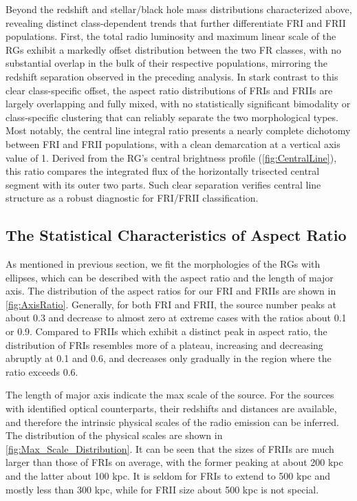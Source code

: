 \documentclass{aa}
\begin{document}
Beyond the redshift and stellar/black hole mass distributions characterized above, revealing distinct class-dependent trends that further differentiate FRI and FRII populations. 
First, the total radio luminosity and maximum linear scale of the RGs exhibit a markedly offset distribution between the two FR classes, with no substantial overlap in the bulk of their respective populations, mirroring the redshift separation observed in the preceding analysis.
In stark contrast to this clear class-specific offset, the aspect ratio distributions of FRIs and FRIIs are largely overlapping and fully mixed, with no statistically significant bimodality or class-specific clustering that can reliably separate the two morphological types.
Most notably, the central line integral ratio presents a nearly complete dichotomy between FRI and FRII populations, with a clean demarcation at a vertical axis value of 1. Derived from the RG's central brightness profile (\autoref{fig:CentralLine}), this ratio compares the integrated flux of the horizontally trisected central segment with its outer two parts. Such clear separation verifies central line structure as a robust diagnostic for FRI/FRII classification.



\subsection{The Statistical Characteristics of Aspect Ratio}\label{sec:Section4_2}

As mentioned in previous section, we fit the morphologies of the RGs with ellipses, which can be described with the aspect ratio and the length of major axis.
The distribution of the aspect ratios for our FRI and FRIIs are shown in \autoref{fig:AxisRatio}. 
Generally, for both FRI and FRII, the source number peaks at about 0.3 and decrease to almost zero at extreme cases with the ratios about 0.1 or 0.9.
Compared to FRIIs which exhibit a distinct peak in aspect ratio, the distribution of FRIs resembles more of a plateau, increasing and decreasing abruptly at 0.1 and 0.6, and decreases only gradually in the region where the ratio exceeds 0.6.

The length of major axis indicate the max scale of the source. For the sources with identified optical counterparts, their redshifts and distances are available, and therefore the intrinsic physical scales of the radio emission can be inferred.  The distribution of the physical scales are shown in \autoref{fig:Max_Scale_Distribution}.
It can be seen that the sizes of FRIIs are much larger than those of FRIs on average, with the former peaking at about 200 kpc and the latter about 100 kpc.
It is seldom for FRIs to extend to 500 kpc and mostly less than 300 kpc, while for FRII size about 500 kpc is not special.
\end{document}

